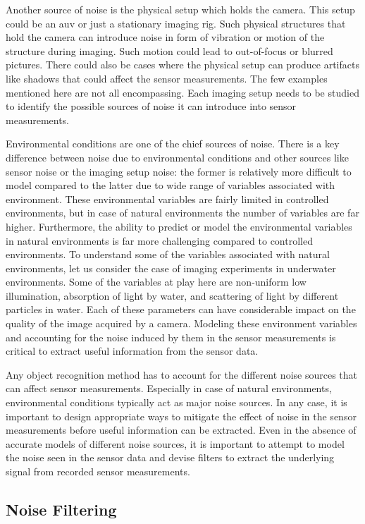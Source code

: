 Another source of noise is the physical setup which holds the camera. This setup could be an \gls{auv} or just a stationary imaging rig. Such physical structures that hold the camera can introduce noise in form of vibration or motion of the structure during imaging. Such motion could lead to out-of-focus or blurred pictures. There could also be cases where the physical setup can produce artifacts like shadows that could affect the sensor measurements. The few examples mentioned here are not all encompassing. Each imaging setup needs to be studied to identify the possible sources of noise it can introduce into sensor measurements.

Environmental conditions are one of the chief sources of noise. 
There is a key difference between noise due to environmental conditions 
and other sources like sensor noise or the imaging setup noise: the former is relatively more difficult to model compared to the latter due to wide range of variables associated with environment. 
These environmental variables are fairly limited in controlled environments, but in case of natural environments
the number of variables are far higher. Furthermore, the ability to predict or model the environmental variables in natural
environments is far more challenging compared to controlled environments. To understand some of the variables associated with natural environments, let us consider the case of imaging experiments in underwater environments. 
Some of the variables at play here are non-uniform low illumination, absorption of light by water,
and scattering of light by different particles in water. Each of these parameters can have considerable impact on the quality of the image acquired by
a camera. Modeling these environment variables and accounting for the noise induced by them in the sensor measurements is critical to extract useful
information from the sensor data.

Any object recognition method has to account for the different noise sources that can affect sensor measurements. Especially in case of natural environments, environmental conditions typically act as major noise sources. 
In any case, it is important to design appropriate ways to mitigate the effect of noise 
in the sensor measurements before useful information can be extracted. 
Even in the absence of accurate models of different noise sources, it is important to attempt to model the noise seen in the sensor data
and devise filters to extract the underlying signal from recorded sensor measurements.

\subsection{Noise Filtering}
\label{sec:noise_filters}

